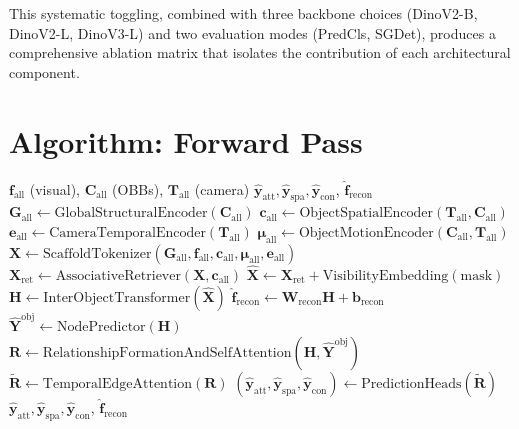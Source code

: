 \documentclass{article}
\newcommand{\mat}[1]{\bm{#1}}
\begin{document}
This systematic toggling, combined with three backbone choices (DinoV2-B, DinoV2-L, DinoV3-L) and two evaluation modes (PredCls, SGDet), produces a comprehensive ablation matrix that isolates the contribution of each architectural component.

\section{Algorithm: Forward Pass}
\label{sec:algorithm}

\begin{algorithm}[h]
\caption{WorldWise Forward Pass}
\begin{algorithmic}[1]
\Require $\mat{f}_{\text{all}}$ (visual), $\mat{C}_{\text{all}}$ (OBBs), $\mat{T}_{\text{all}}$ (camera)
\Ensure $\hat{\mat{y}}_{\text{att}}, \hat{\mat{y}}_{\text{spa}}, \hat{\mat{y}}_{\text{con}}$, $\hat{\mat{f}}_{\text{recon}}$
\State $\mat{G}_{\text{all}} \gets \text{GlobalStructuralEncoder}(\mat{C}_{\text{all}})$
\State $\mat{c}_{\text{all}} \gets \text{ObjectSpatialEncoder}(\mat{T}_{\text{all}}, \mat{C}_{\text{all}})$ 
\State $\mat{e}_{\text{all}} \gets \text{CameraTemporalEncoder}(\mat{T}_{\text{all}})$ 
\State $\mat{\mu}_{\text{all}} \gets \text{ObjectMotionEncoder}(\mat{C}_{\text{all}}, \mat{T}_{\text{all}})$ 
\State $\mat{X} \gets \text{ScaffoldTokenizer}(\mat{G}_{\text{all}}, \mat{f}_{\text{all}}, \mat{c}_{\text{all}}, \mat{\mu}_{\text{all}}, \mat{e}_{\text{all}})$
\State $\mat{X}_{\text{ret}} \gets \text{AssociativeRetriever}(\mat{X}, \mat{c}_{\text{all}})$ 
\State $\hat{\mat{X}} \gets \mat{X}_{\text{ret}} + \text{VisibilityEmbedding}(\text{mask})$
\State $\mat{H} \gets \text{InterObjectTransformer}(\hat{\mat{X}})$
\State $\hat{\mat{f}}_{\text{recon}} \gets \mat{W}_{\text{recon}} \mat{H} + \mat{b}_{\text{recon}}$ 
\State $\hat{\mat{Y}}^{\text{obj}} \gets \text{NodePredictor}(\mat{H})$
\State $\mat{R} \gets \text{RelationshipFormationAndSelfAttention}(\mat{H}, \hat{\mat{Y}}^{\text{obj}})$
\State $\tilde{\mat{R}} \gets \text{TemporalEdgeAttention}(\mat{R})$ 
\State $(\hat{\mat{y}}_{\text{att}}, \hat{\mat{y}}_{\text{spa}}, \hat{\mat{y}}_{\text{con}}) \gets \text{PredictionHeads}(\tilde{\mat{R}})$
\State \Return $\hat{\mat{y}}_{\text{att}}, \hat{\mat{y}}_{\text{spa}}, \hat{\mat{y}}_{\text{con}}$, $\hat{\mat{f}}_{\text{recon}}$
\end{algorithmic}
\end{algorithm}
\end{document}
